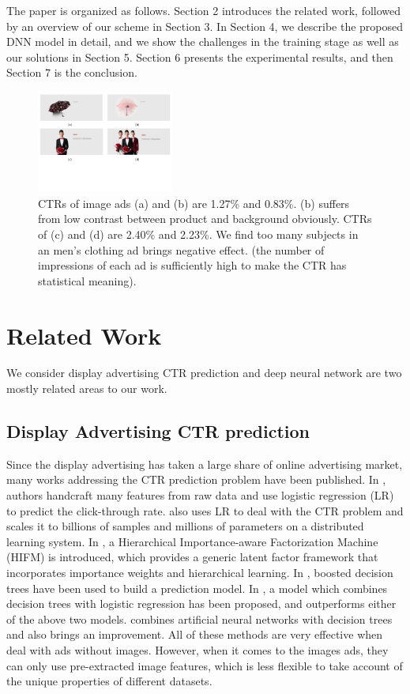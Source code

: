 \documentclass{sig-alternate}
\begin{document}
The paper is organized as follows. Section 2 introduces the related work, followed by an overview of our scheme in Section 3. In Section 4, we describe the proposed DNN model in detail, and we show the challenges in the training stage as well as our solutions  in Section 5. Section 6 presents the experimental results, and then Section 7 is the conclusion.   
\begin{figure}
	\centering
	\includegraphics[width=0.4\textwidth]{compare}
	\caption{CTRs of image ads (a) and (b) are 1.27\% and 0.83\%. (b) suffers from  low contrast between product and background obviously. CTRs of (c) and (d) are 2.40\% and 2.23\%. We find too many subjects in an men's clothing ad brings  negative effect. (the number of impressions of each ad is sufficiently high to make the CTR has statistical meaning).}
	\label{fig:compare}
\end{figure}
\section{Related Work}
We consider display advertising CTR prediction and deep neural network are two mostly related areas to our work.
\subsection{Display Advertising CTR prediction}
Since the display advertising has taken a large share of online advertising market, many works addressing the CTR prediction problem have been published. In \cite{richardson2007predicting,chakrabarti2008contextual}, authors handcraft many features from raw data and use logistic regression (LR) to predict the click-through rate. \cite{chapelle2014simple} also uses LR to deal with the CTR problem and scales it to
billions of samples and millions of parameters on a distributed learning system.  In \cite{oentaryo2014predicting},  a Hierarchical Importance-aware Factorization Machine (HIFM) is introduced, which provides a generic latent factor framework that incorporates importance weights and hierarchical learning. In \cite{dave2010learning}, boosted decision trees have been used to build a prediction model. In \cite{he2014practical},  a model which combines decision
trees with logistic regression has been proposed, and outperforms either of the above two models. \cite{baqapuri2014using} combines artificial neural networks with decision trees and also brings  an improvement. All of these methods are very effective when deal with ads without images. However, when it comes to the images ads, they can only use pre-extracted image features, which is less flexible to take account of the unique properties of different datasets.
\end{document}
